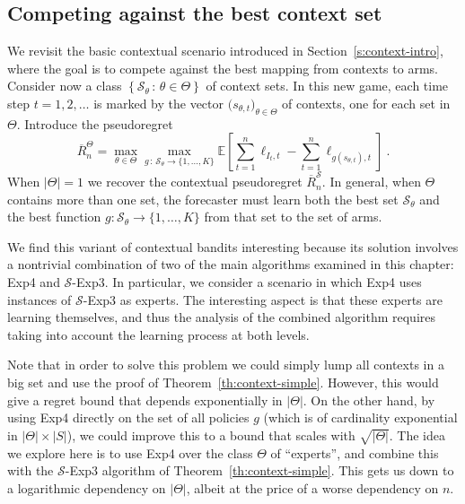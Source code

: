 \documentclass[11pt]{hackednow}
\newcommand{\E}{\mathbb{E}}
\newcommand{\cS}{\mathcal{S}}
\newcommand{\oR}{\overline{R}}
\newcommand{\theset}[2]{\left\{{#1}\,:\,{#2}\right\}}
\newcommand{\oRS}{\oR^{\cS}}
\begin{document}
\subsection{Competing against the best context set}
\label{ss:best-context}
We revisit the basic contextual scenario introduced in Section~\ref{s:context-intro}, where the goal is to compete against the best mapping from contexts to arms. Consider now a class $\theset{\cS_{\theta}}{\theta\in\Theta}$ of context sets. In this new game, each time step $t=1,2,\dots$ is marked by the vector $\bigl(s_{\theta,t}\bigr)_{\theta\in\Theta}$ of contexts, one for each set in $\Theta$. Introduce the pseudoregret
\[
	\oR^{\Theta}_n = \max_{\theta\in\Theta} \max_{g \,:\, \cS_{\theta}\to\{1,\dots,K\}} \E\left[ \sum_{t=1}^n \ell_{I_t,t} - \sum_{t=1}^n \ell_{g(s_{\theta,t}),t} \right]~.
\]
When $|\Theta|=1$ we recover the contextual pseudoregret $\oRS_n$. In general, when $\Theta$ contains more than one set, the forecaster must learn both the best set $\cS_{\theta}$ and the best function $g : \cS_{\theta}\to\{1,\dots,K\}$ from that set to the set of arms.

We find this variant of contextual bandits interesting because its solution involves a nontrivial combination of two of the main algorithms examined in this chapter: Exp4 and $\cS$-Exp3. In particular, we consider a scenario in which Exp4 uses instances of $\cS$-Exp3 as experts. The interesting aspect is that these experts are learning themselves, and thus the analysis of the combined algorithm requires taking into account the learning process at both levels.

Note that in order to solve this problem we could simply lump all contexts in a big set and use the proof of Theorem~\ref{th:context-simple}. However, this would give a regret bound that depends exponentially in $|\Theta|$. On the other hand, by using Exp4 directly on the set of all policies $g$ (which is of cardinality exponential in $|\Theta|\times|S|$), we could improve this to a bound that scales with $\sqrt{|\Theta|}$. The idea we explore here is to use Exp4 over the class $\Theta$ of ``experts'', and combine this with the $\cS$-Exp3 algorithm of Theorem~\ref{th:context-simple}. This gets us down to a logarithmic dependency on $|\Theta|$, albeit at the price of a worse dependency on $n$.
\end{document}
